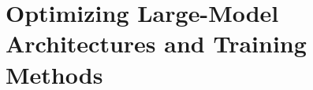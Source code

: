 \setcounter{chapter}{19}

\hypertarget{optimizing-large-model-architectures-and-training-methods}{%
\chapter{Optimizing Large-Model Architectures and Training Methods}\label{optimizing-large-model-architectures-and-training-methods}}
